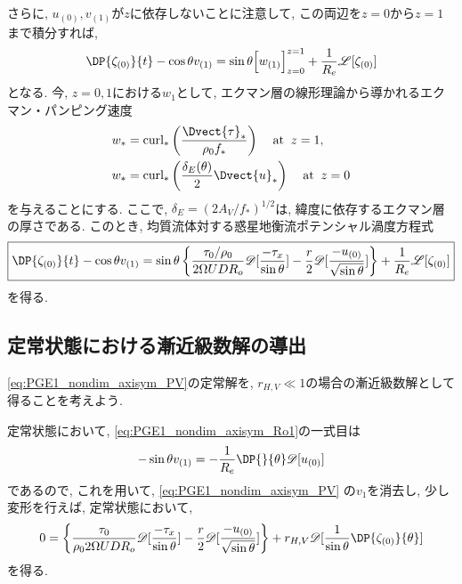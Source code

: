 さらに, $u_{(0)}, v_{(1)}$が$z$に依存しないことに注意して, この両辺を$z=0$から$z=1$まで積分すれば, 
\begin{equation}
    \DP{\zeta_{(0)}}{t} - \cos{\theta} v_{(1)} 
  = \sin{\theta} \Big[ w_{(1)} \Big]_{z=0}^{z=1} + \dfrac{1}{R_e} \mathscr{L}[\zeta_{(0)}]
\end{equation}
となる. 
今, $z=0,1$における$w_1$として, エクマン層の線形理論から導かれるエクマン・パンピング速度
\begin{align*}
  w_* &= {\rm curl}_* \left(\dfrac{\Dvect{\tau}_*}{\rho_0 f_*}\right) \;\;\;\; {\rm at \;\;}z=1, \\
  w_* &= {\rm curl}_* \left( \dfrac{\delta_E(\theta)}{2} \Dvect{u}_* \right) \;\;\;\; {\rm at \;\;}z=0 
\end{align*}
を与えることにする.  
ここで, $\delta_E=(2A_V/f_*)^{1/2}$は, 緯度に依存するエクマン層の厚さである. 
このとき, 均質流体対する惑星地衡流ポテンシャル渦度方程式
\begin{equation}
\boxed{
  \DP{\zeta_{(0)}}{t} - \cos{\theta} v_{(1)}
  = \sin{\theta} \left\{ \dfrac{\tau_0/\rho_0}{2\Omega U D R_o} \mathscr{D}[\dfrac{-\tau_x}{\sin{\theta}}] 
                   - \dfrac{r}{2} \mathscr{D}[\dfrac{-u_{(0)}}{\sqrt{\sin{\theta}}}] \right\}
    + \dfrac{1}{R_e} \mathscr{L}[\zeta_{(0)}]
}
\label{eq:PGE1_nondim_axisym_PV}
\end{equation}
を得る. 

\subsection*{定常状態における漸近級数解の導出}
\eqref{eq:PGE1_nondim_axisym_PV}の定常解を, 
$r_{H,V}\ll 1$の場合の漸近級数解として得ることを考えよう. 

定常状態において, \eqref{eq:PGE1_nondim_axisym_Ro1}の一式目は
\begin{equation}
  - \sin{\theta} v_{(1)} = - \dfrac{1}{R_e}\DP{}{\theta} \mathscr{D}[u_{(0)}]
\label{eq:PGE1_nondim_axisym_Ro1_xmomentum_static}
\end{equation}
であるので, これを用いて, 
\eqref{eq:PGE1_nondim_axisym_PV} の$v_1$を消去し, 
少し変形を行えば, 定常状態において, 
\begin{equation}
 0 = \left\{ \dfrac{\tau_0}{\rho_0 2\Omega U D R_o} \mathscr{D}[\dfrac{-\tau_x}{\sin{\theta}}] 
                   - \dfrac{r}{2} \mathscr{D}[\dfrac{-u_{(0)}}{\sqrt{\sin{\theta}}}] \right\}
    + r_{H,V} \mathscr{D}[\dfrac{1}{\sin{\theta}}\DP{\zeta_{(0)}}{\theta}]
\label{eq:PGE1_nondim_axisym_PV_static}
\end{equation}
を得る. 

